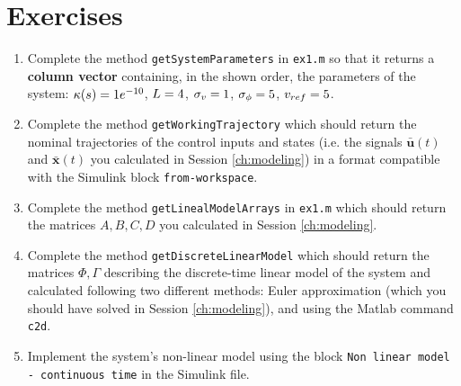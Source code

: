 \section{Exercises}
	\begin{enumerate}
		\setlength\itemsep{0em}
		\item Complete the method \texttt{getSystemParameters} in \texttt{ex1.m} so that it returns a \textbf{column vector} containing, in the shown order, the parameters of the system: %
		$\kappa(s) = 1e^{-10}$, %
		$L = 4$, %
		$\sigma_v = 1$, %
		$\sigma_\phi = 5$,
		$v_{ref}=5$.
		\item Complete the method \texttt{getWorkingTrajectory} which should return the nominal trajectories of the control inputs and states (i.e. the signals $\bar{\mathbf{u}}(t)$ and $\bar{\mathbf{x}}(t)$ you calculated in Session \ref{ch:modeling}) in a format compatible with the Simulink block \texttt{from-workspace}. 
		

		\item Complete the method \texttt{getLinealModelArrays} in \texttt{ex1.m} which should return the matrices %
		$A,B,C,D$ %
		you calculated in Session \ref{ch:modeling}.


		\item Complete the method \texttt{getDiscreteLinearModel} which should return the matrices %
		$\Phi, \Gamma$ %
		describing the discrete-time linear model of the system and calculated following two different methods: Euler approximation (which you should have solved in Session \ref{ch:modeling}), and using the Matlab command \texttt{c2d}.

		\item Implement the system's non-linear model using the block \texttt{Non linear model - continuous time} in the Simulink file. 

		


\end{enumerate}
